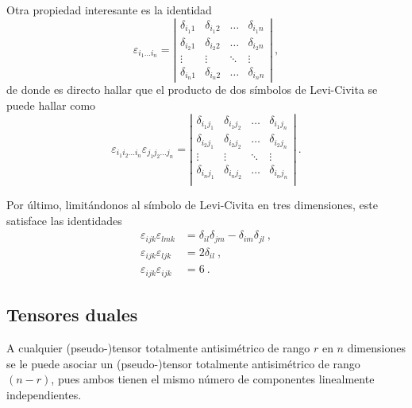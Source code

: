 Otra propiedad interesante es la identidad
\begin{equation}
    \varepsilon_{i_1 \dots i_n} = \left| \begin{array}{cccc}
        \delta_{i_1 1} & \delta_{i_1 2} & \dots & \delta_{i_1 n} \\
        \delta_{i_2 1} & \delta_{i_2 2} & \dots & \delta_{i_2 n} \\
        \vdots & \vdots & \ddots & \vdots \\
        \delta_{i_n 1} & \delta_{i_n 2} & \dots & \delta_{i_n n} 
    \end{array} \right| \ ,
\end{equation}
de donde es directo hallar que el producto de dos símbolos de Levi-Civita se puede hallar como
\begin{equation}
    \varepsilon_{i_1 i_2 \dots i_n} \varepsilon_{j_1 j_2 \dots j_n} = \left| \begin{array}{cccc}
        \delta_{i_1 j_1} & \delta_{i_1 j_2} & \dots & \delta_{i_1 j_n} \\
        \delta_{i_2 j_1} & \delta_{i_2 j_2} & \dots & \delta_{i_2 j_n} \\
        \vdots & \vdots & \ddots & \vdots \\
        \delta_{i_n j_1} & \delta_{i_n j_2} & \dots & \delta_{i_n j_n} \\
    \end{array}
    \right| \ .
\end{equation}

Por último, limitándonos al símbolo de Levi-Civita en tres dimensiones, este satisface las identidades
\begin{align}
    \varepsilon_{ijk} \varepsilon_{lmk} & = \delta_{il} \delta_{jm} - \delta_{im} \delta_{jl} \ , \\
    \varepsilon_{ijk} \varepsilon_{ljk} & = 2 \delta_{il} \ , \\
    \varepsilon_{ijk} \varepsilon_{ijk} & = 6 \ .
\end{align}


\subsection{Tensores duales}

A cualquier (pseudo-)tensor totalmente antisimétrico de rango $r$ en $n$ dimensiones se le puede asociar un (pseudo-)tensor totalmente antisimétrico de rango $(n-r)$, pues ambos tienen el mismo número de componentes linealmente independientes.

